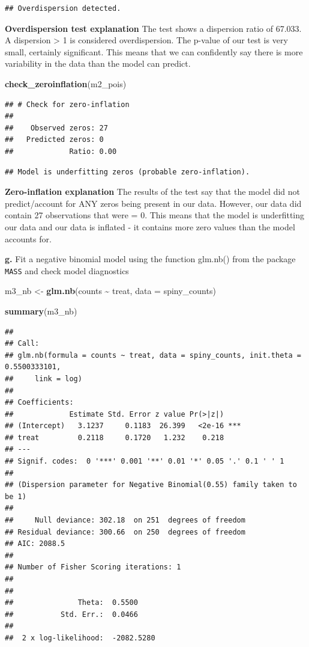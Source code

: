 \documentclass[
]{article}
\newenvironment{Shaded}{\begin{snugshade}}{\end{snugshade}}
\newcommand{\AttributeTok}[1]{\textcolor[rgb]{0.13,0.29,0.53}{#1}}
\newcommand{\FunctionTok}[1]{\textcolor[rgb]{0.13,0.29,0.53}{\textbf{#1}}}
\newcommand{\NormalTok}[1]{#1}
\newcommand{\OtherTok}[1]{\textcolor[rgb]{0.56,0.35,0.01}{#1}}
\newcommand{\SpecialCharTok}[1]{\textcolor[rgb]{0.81,0.36,0.00}{\textbf{#1}}}
\begin{document}
\begin{verbatim}
## Overdispersion detected.
\end{verbatim}

\textbf{Overdispersion test explanation} The test shows a dispersion
ratio of 67.033. A dispersion \textgreater{} 1 is considered
overdispersion. The p-value of our test is very small, certainly
significant. This means that we can confidently say there is more
variability in the data than the model can predict.

\begin{Shaded}
\begin{Highlighting}[]
\FunctionTok{check\_zeroinflation}\NormalTok{(m2\_pois)}
\end{Highlighting}
\end{Shaded}

\begin{verbatim}
## # Check for zero-inflation
## 
##    Observed zeros: 27
##   Predicted zeros: 0
##             Ratio: 0.00
\end{verbatim}

\begin{verbatim}
## Model is underfitting zeros (probable zero-inflation).
\end{verbatim}

\textbf{Zero-inflation explanation} The results of the test say that the
model did not predict/account for ANY zeros being present in our data.
However, our data did contain 27 observations that were = 0. This means
that the model is underfitting our data and our data is inflated - it
contains more zero values than the model accounts for.

\textbf{g.} Fit a negative binomial model using the function glm.nb()
from the package \texttt{MASS} and check model diagnostics

\begin{Shaded}
\begin{Highlighting}[]
\NormalTok{m3\_nb }\OtherTok{\textless{}{-}} \FunctionTok{glm.nb}\NormalTok{(counts }\SpecialCharTok{\textasciitilde{}}\NormalTok{ treat,}
                \AttributeTok{data =}\NormalTok{ spiny\_counts)}

\FunctionTok{summary}\NormalTok{(m3\_nb)}
\end{Highlighting}
\end{Shaded}

\begin{verbatim}
## 
## Call:
## glm.nb(formula = counts ~ treat, data = spiny_counts, init.theta = 0.5500333101, 
##     link = log)
## 
## Coefficients:
##             Estimate Std. Error z value Pr(>|z|)    
## (Intercept)   3.1237     0.1183  26.399   <2e-16 ***
## treat         0.2118     0.1720   1.232    0.218    
## ---
## Signif. codes:  0 '***' 0.001 '**' 0.01 '*' 0.05 '.' 0.1 ' ' 1
## 
## (Dispersion parameter for Negative Binomial(0.55) family taken to be 1)
## 
##     Null deviance: 302.18  on 251  degrees of freedom
## Residual deviance: 300.66  on 250  degrees of freedom
## AIC: 2088.5
## 
## Number of Fisher Scoring iterations: 1
## 
## 
##               Theta:  0.5500 
##           Std. Err.:  0.0466 
## 
##  2 x log-likelihood:  -2082.5280
\end{verbatim}
\end{document}

